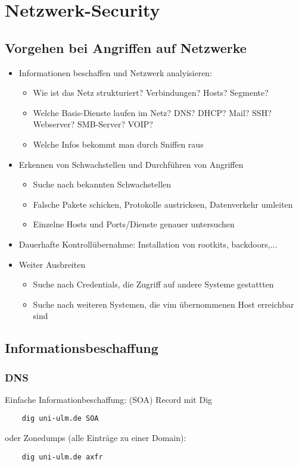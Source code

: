 \chapter{Netzwerk-Security}
\section{Vorgehen bei Angriffen auf Netzwerke}
\begin{itemize}
    \item Informationen beschaffen und Netzwerk analyisieren:
        \begin{itemize}
            \item Wie ist das Netz strukturiert? Verbindungen? Hosts? Segmente?
            \item Welche Basis-Dienste laufen im Netz? DNS? DHCP? Mail? SSH? Webserver? SMB-Server? VOIP?
            \item Welche Infos bekommt man durch Sniffen raus
        \end{itemize}
    \item Erkennen von Schwachstellen und Durchführen von Angriffen
        \begin{itemize}
            \item Suche nach bekannten Schwachstellen
            \item Falsche Pakete schicken, Protokolle austricksen, Datenverkehr umleiten
            \item Einzelne Hosts und Ports/Dienste genauer untersuchen
        \end{itemize}
    \item Dauerhafte Kontrollübernahme: Installation von rootkits, backdoors,...
    \item Weiter Ausbreiten
        \begin{itemize}
            \item Suche nach Credentials, die Zugriff auf andere Systeme gestattten
            \item Suche nach weiteren Systemen, die vim übernommenen Host erreichbar sind
        \end{itemize}
\end{itemize}

\section{Informationsbeschaffung}
\subsection{DNS}
Einfache Informationbeschaffung:  (SOA) Record mit Dig
\begin{lstlisting}
    dig uni-ulm.de SOA
\end{lstlisting}
oder Zonedumps (alle Einträge zu einer Domain):
\begin{lstlisting}
    dig uni-ulm.de axfr
\end{lstlisting}

